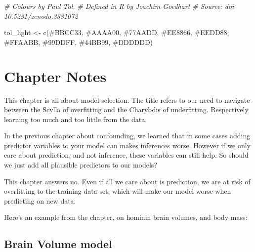 \documentclass[
]{book}
\newenvironment{Shaded}{\begin{snugshade}}{\end{snugshade}}
\newcommand{\CommentTok}[1]{\textcolor[rgb]{0.56,0.35,0.01}{\textit{#1}}}
\newcommand{\FunctionTok}[1]{\textcolor[rgb]{0.00,0.00,0.00}{#1}}
\newcommand{\NormalTok}[1]{#1}
\newcommand{\OtherTok}[1]{\textcolor[rgb]{0.56,0.35,0.01}{#1}}
\newcommand{\StringTok}[1]{\textcolor[rgb]{0.31,0.60,0.02}{#1}}
\begin{document}
\begin{Shaded}
\begin{Highlighting}[]
\CommentTok{\# Colours by Paul Tol.}
\CommentTok{\# Defined in R by Joachim Goedhart }
\CommentTok{\# Source: doi 10.5281/zenodo.3381072}

\NormalTok{tol\_light }\OtherTok{\textless{}{-}} \FunctionTok{c}\NormalTok{(}\StringTok{\textquotesingle{}\#BBCC33\textquotesingle{}}\NormalTok{, }\StringTok{\textquotesingle{}\#AAAA00\textquotesingle{}}\NormalTok{, }\StringTok{\textquotesingle{}\#77AADD\textquotesingle{}}\NormalTok{, }\StringTok{\textquotesingle{}\#EE8866\textquotesingle{}}\NormalTok{, }\StringTok{\textquotesingle{}\#EEDD88\textquotesingle{}}\NormalTok{, }\StringTok{\textquotesingle{}\#FFAABB\textquotesingle{}}\NormalTok{, }\StringTok{\textquotesingle{}\#99DDFF\textquotesingle{}}\NormalTok{, }\StringTok{\textquotesingle{}\#44BB99\textquotesingle{}}\NormalTok{, }\StringTok{\textquotesingle{}\#DDDDDD\textquotesingle{}}\NormalTok{)}
\end{Highlighting}
\end{Shaded}

\hypertarget{chapter-notes-6}{%
\section{Chapter Notes}\label{chapter-notes-6}}

This chapter is all about model selection. The title refers to our need to navigate between the Scylla of overfitting and the Charybdis of underfitting. Respectively learning too much and too little from the data.

In the previous chapter about confounding, we learned that in some cases adding predictor variables to your model can makes inferences worse. However if we only care about prediction, and not inference, these variables can still help. So should we just add all plausible predictors to our models?

This chapter answers no. Even if all we care about is prediction, we are at risk of overfitting to the training data set, which will make our model worse when predicting on new data.

Here's an example from the chapter, on hominin brain volumes, and body mass:

\hypertarget{brain-volume-model}{%
\subsection*{Brain Volume model}\label{brain-volume-model}}
\end{document}
